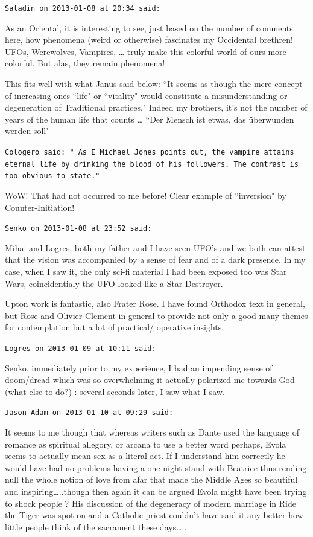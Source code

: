 \begin{footnotesize}
\begin{sffamily}
\hfill

\texttt{Saladin on 2013-01-08 at 20:34 said: }

As an Oriental, it is interesting to see, just based on the number of comments here, how phenomena (weird or otherwise) fascinates my Occidental brethren! UFOs, Werewolves, Vampires, … truly make this colorful world of ours more colorful. But alas, they remain phenomena!

This fits well with what Janus said below: ``It seems as though the mere concept of increasing ones ``life" or ``vitality" would constitute a misunderstanding or degeneration of Traditional practices." Indeed my brothers, it's not the number of years of the human life that counts … ``Der Mensch ist etwas, das überwunden werden soll"

\texttt{Cologero said: " As E Michael Jones points out, the vampire attains eternal life by drinking the blood of his followers. The contrast is too obvious to state."}

WoW! That had not occurred to me before! Clear example of ``inversion" by Counter-Initiation!


\hfill

\texttt{Senko on 2013-01-08 at 23:52 said: }

Mihai and Logres, both my father and I have seen UFO's and we both can attest that the vision was accompanied by a sense of fear and of a dark presence. In my case, when I saw it, the only sci-fi material I had been exposed too was Star Wars, coincidentialy the UFO looked like a Star Destroyer.

Upton work is fantastic, also Frater Rose. I have found Orthodox text in general, but Rose and Olivier Clement in general to provide not only a good many themes for contemplation but a lot of practical/ operative insights.


\hfill

\texttt{Logres on 2013-01-09 at 10:11 said: }

Senko, immediately prior to my experience, I had an impending sense of doom/dread which was so overwhelming it actually polarized me towards God (what else to do?) : several seconds later, I saw what I saw.


\hfill

\texttt{Jason-Adam on 2013-01-10 at 09:29 said: }

It seems to me though that whereas writers such as Dante used the language of romance as spiritual allegory, or arcana to use a better word perhaps, Evola seems to actually mean sex as a literal act. If I understand him correctly he would have had no problems having a one night stand with Beatrice thus rending null the whole notion of love from afar that made the Middle Ages so beautiful and inspiring…..though then again it can be argued Evola might have been trying to shock people ? His discussion of the degeneracy of modern marriage in Ride the Tiger was spot on and a Catholic priest couldn't have said it any better how little people think of the sacrament these days…..



\end{sffamily}
\end{footnotesize}
